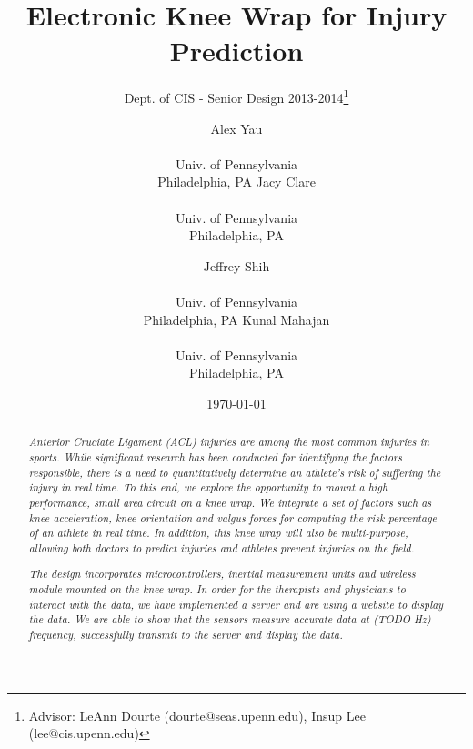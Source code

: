 \documentclass{sig-alternate}
\begin{document}
 
\nocite{*}
\title{Electronic Knee Wrap for Injury Prediction}
\subtitle{Dept. of CIS - Senior Design 2013-2014\thanks{Advisor: LeAnn Dourte (dourte@seas.upenn.edu), Insup Lee (lee@cis.upenn.edu)}}
\author{
\alignauthor Alex Yau \\  \\ Univ. of Pennsylvania \\ Philadelphia, PA
\alignauthor Jacy Clare \\  \\ Univ. of Pennsylvania \\ Philadelphia, PA
\and 
\alignauthor Jeffrey Shih \\  \\ Univ. of Pennsylvania \\ Philadelphia, PA
\alignauthor Kunal Mahajan \\  \\ Univ. of Pennsylvania \\ Philadelphia, PA}
\date{\today}
\maketitle

\begin{abstract}

  \textit{Anterior Cruciate Ligament (ACL) injuries are among the most common injuries in sports. While significant research has been conducted for identifying the factors responsible, there is a need to quantitatively determine an athlete's risk of suffering the injury in real time. To this end, we explore the opportunity to mount a high performance, small area circuit on a knee wrap. We integrate a set of factors such as knee acceleration, knee orientation and valgus forces for computing the risk percentage of an athlete in real time. In addition, this knee wrap will also be multi-purpose, allowing both doctors to predict injuries and athletes prevent injuries on the field.}

  \textit{The design incorporates microcontrollers, inertial measurement units and wireless module mounted on the knee wrap. In order for the therapists and physicians to interact with the data, we have implemented a server and are using a website to display the data. We are able to show that the sensors measure accurate data at (TODO Hz) frequency, successfully transmit to the server and display the data.}

\end{abstract}
\end{document}
